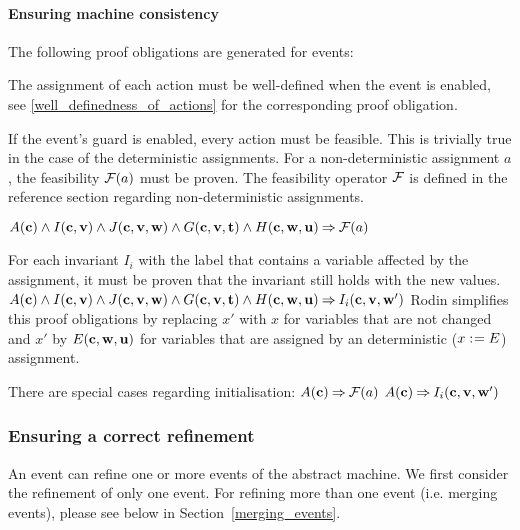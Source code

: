 \paragraph{Ensuring machine consistency}
\label{consistency_proof_obligations}
The following proof obligations are generated for events:

The assignment of each action must be well-defined when the event is enabled, see
  \ref{well_definedness_of_actions} for the corresponding proof obligation.
  
If the event's guard is enabled, every action must be feasible.
  This is trivially true in the case of the deterministic assignments.
  For a non-deterministic assignment $a$, the feasibility $\mathcal{F}(a)$ must be proven.
  The feasibility operator $\mathcal{F}$ is defined in the reference
  section regarding non-deterministic assignments.
  
  {$A(\mathbf{c}) \land I(\mathbf{c},\mathbf{v}) \land J(\mathbf{c},\mathbf{v},\mathbf{w})
    \land G(\mathbf{c},\mathbf{v},\mathbf{t}) \land H(\mathbf{c},\mathbf{w},\mathbf{u}) 
    \mathbin\Rightarrow \mathcal{F}(a)$}

For each invariant $I_i$ with the label  
  that contains a variable affected by the assignment, it must be proven
  that the invariant still holds with the new values.
  {}%
  {$A(\mathbf{c}) \land I(\mathbf{c},\mathbf{v}) \land J(\mathbf{c},\mathbf{v},\mathbf{w}) 
    \land G(\mathbf{c},\mathbf{v},\mathbf{t}) \land H(\mathbf{c},\mathbf{w},\mathbf{u})
    \mathbin\Rightarrow I_i(\mathbf{c},{\mathbf{v},\mathbf{w}}')$}
  Rodin simplifies this proof obligations by replacing $x'$ with $x$ for variables that are not
  changed and $x'$ by $E(\mathbf{c},\mathbf{w},\mathbf{u})$ 
  for variables that are assigned by an deterministic ($x \mathrel{:\mkern1mu=} E$) assignment.

There are special cases regarding initialisation:
  {$A(\mathbf{c}) \mathbin\Rightarrow  \mathcal{F}(a)$}
  {}%
  {$A(\mathbf{c}) \mathbin\Rightarrow I_i(\mathbf{c},{\mathbf{v},\mathbf{w}}')$}

\subsubsection{Ensuring a correct refinement}
\label{refinement_proof_obligations}
An event can refine one or more events of the abstract machine.
We first consider the refinement of only one event. 
For refining more than one event (i.e. merging events), please see below in Section~\ref{merging_events}.


